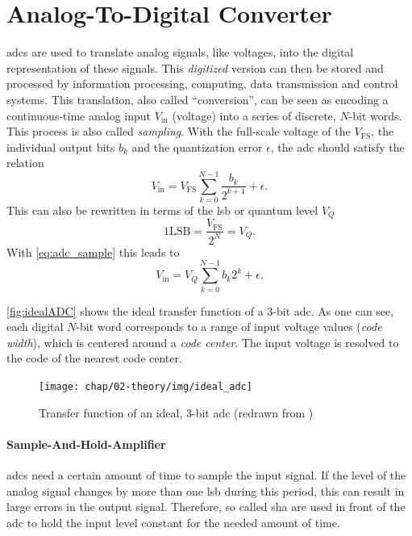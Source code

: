 \section{Analog-To-Digital Converter}
\Glspl{adc} are used to translate analog signals, like voltages, into the digital representation of these signals.
This \textit{digitized} version can then be stored and processed by information processing, computing, data transmission and control systems. 
This translation, also called ``conversion'', can be seen as encoding a continuous-time analog input $V_\text{in}$ (voltage) into a series of discrete, $N$-bit words. This process is also called \textit{sampling}. 
With the full-scale voltage of the $V_{\text{FS}}$, the individual output bits $b_k$ and the quantization error $\epsilon$, the \gls{adc} should satisfy the relation
\begin{equation} \label{eq:adc_sample}
	V_{\text{in}} = V_{\text{FS}} \sum_{k = 0}^{N-1} \frac{b_k}{2^{k+1}} + \epsilon.
\end{equation}
This can also be rewritten in terms of the \gls{lsb} or quantum level $V_Q$
\begin{equation}
	1 \text{LSB} = \frac{V_\text{FS}}{2^N} = V_Q.
\end{equation}
With \autoref{eq:adc_sample} this leads to 
\begin{equation}
	V_\text{in} = V_Q \sum_{k = 0}^{N-1} b_k 2^{k}  + \epsilon.
\end{equation}

\autoref{fig:idealADC} shows the ideal transfer function of a 3-bit \gls{adc}. 
As one can see, each digital $N$-bit word corresponds to a range of input voltage values (\textit{code width}), which is centered around a \textit{code center}. The input voltage is resolved to the code of the nearest code center.
\begin{figure}[H]
	\centering
	\texttt{[image: chap/02-theory/img/ideal\_adc]}
	\caption[Transfer function of ideal, 3-bit ADC]{Transfer function of an ideal, 3-bit \gls{adc} (redrawn from \cite{Lundberg})}
	\label{fig:idealADC}
\end{figure}


\paragraph{Sample-And-Hold-Amplifier}
\Glspl{adc} need a certain amount of time to sample the input signal.
If the level of the analog signal changes by more than one \gls{lsb} during this period, this can result in large errors in the output signal.
Therefore, so called \gls{sha} are used in front of the \gls{adc} to hold the input level constant for the needed amount of time.

